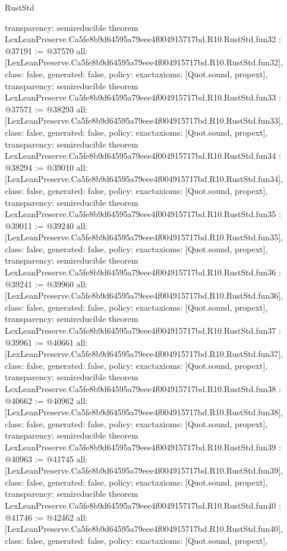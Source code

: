 \begin{lexlean}{RustStd}
\begin{coremodule}
{  transparency: semireducible
}
theorem LexLeanPreserve.Ca5fe8b9d64595a79eee4f004915717bd.R10.RustStd.fun32 : @37191 := @37570 {
  all: [LexLeanPreserve.Ca5fe8b9d64595a79eee4f004915717bd.R10.RustStd.fun32],
  class: false,
  generated: false,
  policy: exact{axioms: [Quot.sound, propext]},
  transparency: semireducible
}
theorem LexLeanPreserve.Ca5fe8b9d64595a79eee4f004915717bd.R10.RustStd.fun33 : @37571 := @38293 {
  all: [LexLeanPreserve.Ca5fe8b9d64595a79eee4f004915717bd.R10.RustStd.fun33],
  class: false,
  generated: false,
  policy: exact{axioms: [Quot.sound, propext]},
  transparency: semireducible
}
theorem LexLeanPreserve.Ca5fe8b9d64595a79eee4f004915717bd.R10.RustStd.fun34 : @38294 := @39010 {
  all: [LexLeanPreserve.Ca5fe8b9d64595a79eee4f004915717bd.R10.RustStd.fun34],
  class: false,
  generated: false,
  policy: exact{axioms: [Quot.sound, propext]},
  transparency: semireducible
}
theorem LexLeanPreserve.Ca5fe8b9d64595a79eee4f004915717bd.R10.RustStd.fun35 : @39011 := @39240 {
  all: [LexLeanPreserve.Ca5fe8b9d64595a79eee4f004915717bd.R10.RustStd.fun35],
  class: false,
  generated: false,
  policy: exact{axioms: [Quot.sound, propext]},
  transparency: semireducible
}
theorem LexLeanPreserve.Ca5fe8b9d64595a79eee4f004915717bd.R10.RustStd.fun36 : @39241 := @39960 {
  all: [LexLeanPreserve.Ca5fe8b9d64595a79eee4f004915717bd.R10.RustStd.fun36],
  class: false,
  generated: false,
  policy: exact{axioms: [Quot.sound, propext]},
  transparency: semireducible
}
theorem LexLeanPreserve.Ca5fe8b9d64595a79eee4f004915717bd.R10.RustStd.fun37 : @39961 := @40661 {
  all: [LexLeanPreserve.Ca5fe8b9d64595a79eee4f004915717bd.R10.RustStd.fun37],
  class: false,
  generated: false,
  policy: exact{axioms: [Quot.sound, propext]},
  transparency: semireducible
}
theorem LexLeanPreserve.Ca5fe8b9d64595a79eee4f004915717bd.R10.RustStd.fun38 : @40662 := @40962 {
  all: [LexLeanPreserve.Ca5fe8b9d64595a79eee4f004915717bd.R10.RustStd.fun38],
  class: false,
  generated: false,
  policy: exact{axioms: [Quot.sound, propext]},
  transparency: semireducible
}
theorem LexLeanPreserve.Ca5fe8b9d64595a79eee4f004915717bd.R10.RustStd.fun39 : @40963 := @41745 {
  all: [LexLeanPreserve.Ca5fe8b9d64595a79eee4f004915717bd.R10.RustStd.fun39],
  class: false,
  generated: false,
  policy: exact{axioms: [Quot.sound, propext]},
  transparency: semireducible
}
theorem LexLeanPreserve.Ca5fe8b9d64595a79eee4f004915717bd.R10.RustStd.fun40 : @41746 := @42462 {
  all: [LexLeanPreserve.Ca5fe8b9d64595a79eee4f004915717bd.R10.RustStd.fun40],
  class: false,
  generated: false,
  policy: exact{axioms: [Quot.sound, propext]},
}
\end{coremodule}
\end{lexlean}
